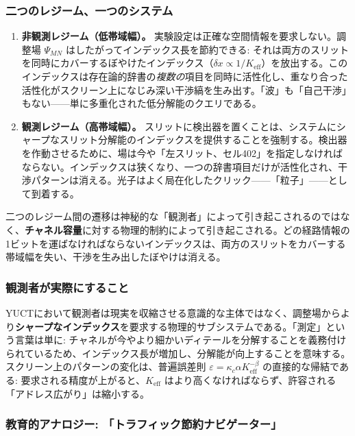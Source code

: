 \documentclass[12pt,a4paper]{article}
\theoremstyle{definition}
\theoremstyle{remark}
\begin{document}
	\subsubsection{二つのレジーム、一つのシステム}
	
	\begin{enumerate}[leftmargin=*]
		\item \textbf{非観測レジーム（低帯域幅）。}
		実験設定は正確な空間情報を要求しない。調整場 $\Psi_{MN}$ はしたがってインデックス長を節約できる: それは両方のスリットを同時にカバーするぼやけたインデックス（$\delta x \propto 1/K_{\mathrm{eff}}$）を放出する。このインデックスは存在論的辞書の\emph{複数の}項目を同時に活性化し、重なり合った活性化がスクリーン上になじみ深い干渉縞を生み出す。「波」も「自己干渉」もない——単に多重化された低分解能のクエリである。
		
		\item \textbf{観測レジーム（高帯域幅）。}
		スリットに検出器を置くことは、システムにシャープなスリット分解能のインデックスを提供することを強制する。検出器を作動させるために、場は今や「左スリット、セル402」を指定しなければならない。インデックスは狭くなり、一つの辞書項目だけが活性化され、干渉パターンは消える。光子はよく局在化したクリック——「粒子」——として到着する。
	\end{enumerate}
	
	二つのレジーム間の遷移は神秘的な「観測者」によって引き起こされるのではなく、\textbf{チャネル容量}に対する物理的制約によって引き起こされる。どの経路情報の1ビットを運ばなければならないインデックスは、両方のスリットをカバーする帯域幅を失い、干渉を生み出したぼやけは消える。
	
	\subsubsection{観測者が実際にすること}
	
	YUCTにおいて観測者は現実を収縮させる意識的な主体ではなく、調整場からより\textbf{シャープなインデックス}を要求する物理的サブシステムである。「測定」という言葉は単に: チャネルが今やより細かいディテールを分解することを義務付けられているため、インデックス長が増加し、分解能が向上することを意味する。スクリーン上のパターンの変化は、普遍誤差則 $\varepsilon = \kappa_c \alpha K_{\mathrm{eff}}^{-\beta}$ の直接的な帰結である: 要求される精度が上がると、$K_{\mathrm{eff}}$ はより高くなければならず、許容される「アドレス広がり」は縮小する。
	
	\subsubsection{教育的アナロジー: 「トラフィック節約ナビゲーター」}
	
\end{document}
